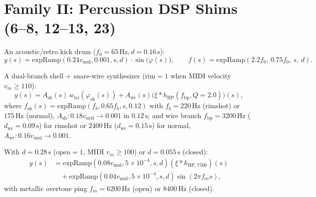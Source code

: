\section{Family II: Percussion DSP Shims (6--8, 12--13, 23)}
\label{sec:fam-perc}

\begin{definition}
An acoustic/retro kick drum ($f_0 = 65\,\text{Hz}, d = 0.16\,\text{s}$):
\begin{equation}
y(s) = \mathrm{expRamp}(0.24 v_{\mathrm{mul}}, 0.001, s, d)\cdot \sin\!\big(\varphi(s)\big), \qquad
f(s) = \mathrm{expRamp}(2.2 f_0,\, 0.75 f_0,\, s,\, d).
\end{equation}
\end{definition}

\begin{definition}
A dual-branch shell + snare-wire synthesizer ($\mathrm{rim} = 1$ when MIDI velocity $v_m \ge 110$):
\begin{equation}
y(s) = A_{\mathrm{sh}}(s)\,w_{\mathrm{tri}}(\varphi_{\mathrm{sh}}(s)) + A_{\mathrm{wr}}(s)\big(\xi * h_{\mathrm{BP}}(f_{\mathrm{bp}}, Q=2.0)\big)(s),
\end{equation}
where $f_{\mathrm{sh}}(s) = \mathrm{expRamp}(f_b, 0.65 f_b, s, 0.12)$ with $f_b = 220\,\text{Hz}$ (rimshot) or $175\,\text{Hz}$ (normal), $A_{\mathrm{sh}}: 0.18 v_{\mathrm{mul}} \to 0.001$ in $0.12\,\text{s}$; and wire branch $f_{\mathrm{bp}} = 3200\,\text{Hz}$ ($d_{\mathrm{wr}} = 0.09\,\text{s}$) for rimshot or $2400\,\text{Hz}$ ($d_{\mathrm{wr}} = 0.15\,\text{s}$) for normal, $A_{\mathrm{wr}}: 0.16 v_{\mathrm{mul}} \to 0.001$.
\end{definition}

\begin{definition}
With $d = 0.28\,\text{s}$ ($\mathrm{open} = 1$, MIDI $v_m \ge 100$) or $d = 0.055\,\text{s}$ (closed):
\begin{align}
y(s) &= \mathrm{expRamp}(0.08 v_{\mathrm{mul}}, 5\!\times\!10^{-4}, s, d)(\xi * h_{\mathrm{HP},7500})(s) \nonumber\\
     &\quad + \mathrm{expRamp}(0.04 v_{\mathrm{mul}}, 5\!\times\!10^{-4}, s, d)\sin(2\pi f_m s),
\end{align}
with metallic overtone ping $f_m = 6200\,\text{Hz}$ (open) or $8400\,\text{Hz}$ (closed).
\end{definition}

